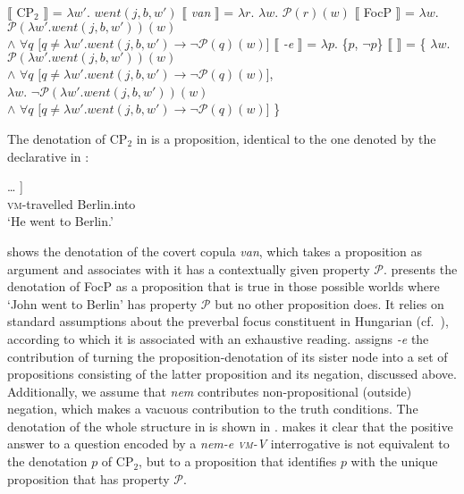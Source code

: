 \documentclass[output=paper,colorlinks,citecolor=brown]{langscibook}
\begin{document}
	\ea\label{ex:denotation_covert}
	\ea\label{ex:CP} 
	$\llbracket$ CP$_2$ $\rrbracket$ = $\lambda w'.$ $went(j,b,w')$
	\ex\label{ex:van}
	$\llbracket$ \textit{van} $\rrbracket$ =  $\lambda r.$ $\lambda w.$ $\mathcal{P}(r)(w)$ 
	\ex\label{ex:FocP}
	$\llbracket$ FocP $\rrbracket$ = $\lambda w.$ $\mathcal{P}(\lambda w'. went(j,b,w'))(w)$ \\ \hspace{1.7cm}$ \wedge$ $ \forall q$ $[q \neq \lambda w'. went(j,b,w')   \rightarrow \neg\mathcal{P}(q)(w)$]    
	\ex\label{ex:den-e}
	$\llbracket$ \textit{-e} $\rrbracket$ = $\lambda p.$ \{$p$, $\neg p$\}
	\ex\label{ex:CP1} 
	$\llbracket$  $\rrbracket$ =  \{ $\lambda w.$ $\mathcal{P}(\lambda w'. went(j,b,w'))(w)$ \\
    \hspace{2cm}$ \wedge$ $ \forall q$ $[q \neq \lambda w'. went(j,b,w')   \rightarrow \neg\mathcal{P}(q)(w)$], \\
    \hspace{1.6cm} $ \lambda w.$ $\neg \mathcal{P}(\lambda w'. went(j,b,w'))(w)$ \\
	\hspace{1.9cm} $ \wedge$ $ \forall q$ $[q \neq \lambda w'. went(j,b,w')   \rightarrow \neg\mathcal{P}(q)(w)$]   \}  
	\z
	\z
	
	
	
	\noindent The denotation of CP$_2$ in  is a proposition, identical to the one  denoted by the declarative in :
	
	\ea\label{ex:kiutazott-decl}
	\gll [\textsubscript{CP} \dots { }[\textsubscript{IP} Ki-utazott Berlinbe ] \dots { }]\\
	{} {}    \textsc{vm}-travelled Berlin.into\\
	\glt `He went to Berlin.'
	\z
	
	
	\noindent {} shows the denotation of the covert copula \textit{van}, which  takes a proposition as argument and associates with it has a contextually given property $\mathcal{P}$. 
	 presents the denotation of FocP as a proposition that is true in those possible worlds where `John went to Berlin' has  property $\mathcal{P}$ but no other proposition does.  
	It relies on standard assumptions about the preverbal focus constituent in Hungarian (cf.~\citealt{szabolcsi94}), according to which it is associated with an exhaustive reading.
	 assigns \textit{-e} the contribution of turning the proposition-denotation of its sister node into a set of propositions consisting of the latter proposition and its negation, discussed above. Additionally, we assume that \textit{nem} contributes non-propositional (outside) negation, which makes a vacuous contribution to the truth conditions. The denotation of the whole structure in  is shown  in .  makes it clear that the positive answer to a question encoded by a \textit{nem-e \textsc{vm}-V} interrogative is not equivalent to the denotation $p$ of CP$_2$, but to  a proposition that identifies $p$ with the unique proposition that has  property $\mathcal{P}$.
	
\end{document}
